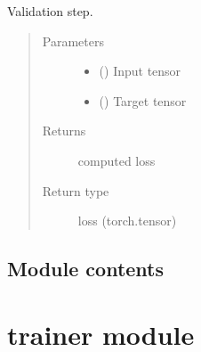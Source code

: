 \documentclass[letterpaper,10pt,english]{sphinxmanual}
\begin{document}
\begin{fulllineitems}
\begin{fulllineitems}
\label{\detokenize{nn:nn.sequential.Sequential.validation_step}}
Validation step.
\begin{quote}\begin{description}
\item[{Parameters}] \leavevmode\begin{itemize}
\item {} 
 () \textendash{} Input tensor

\item {} 
 () \textendash{} Target tensor

\end{itemize}

\item[{Returns}] \leavevmode
computed loss

\item[{Return type}] \leavevmode
loss (torch.tensor)

\end{description}\end{quote}

\end{fulllineitems}


\end{fulllineitems}



\subsection{Module contents}
\label{\detokenize{nn:module-nn}}\label{\detokenize{nn:module-contents}}

\section{trainer module}
\label{\detokenize{trainer:module-trainer}}\label{\detokenize{trainer:trainer-module}}\label{\detokenize{trainer::doc}}
\end{document}
